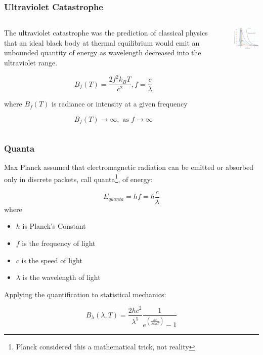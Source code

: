\documentclass{beamer}
\begin{document}
\begin{frame}\frametitle{Ultraviolet Catastrophe}
\begin{columns}
\begin{column}{7.2cm}

The ultraviolet catastrophe was the prediction of classical physics that an ideal black body at thermal equilibrium would emit an unbounded quantity of energy as wavelength decreased into the ultraviolet range.

\[ B_{f}(T) = \frac{2 f^2 k_B T}{c^2}, f = \frac{c}{\lambda}\]

where $B_f(T)$ is radiance or intensity at a given frequency

\[B_{f}(T) \rightarrow \infty, \text{ as } f \rightarrow \infty\]

\end{column}
\begin{column}{4cm}
\begin{center}
\includegraphics[width=4cm]{fig/blackbody.jpg}
\end{center}
\end{column}
\end{columns}
\end{frame}

\begin{frame}\frametitle{Quanta}

Max Planck assumed that electromagnetic radiation can be emitted or absorbed only in discrete packets, call quanta\footnote{Planck considered this a mathematical trick, not reality}, of energy:

\[ E_{quanta} = h f = h \frac{c}{\lambda}\]
where
\begin{itemize}
\item $h$ is Planck's Constant
\item $f$ is the frequency of light
\item $c$ is the speed of light
\item $\lambda$ is the wavelength of light
\end{itemize}

Applying the quantification to statistical mechanics:

\[ B_{\lambda}(\lambda,T) = \frac{2hc^2}{\lambda^5}\frac{1}{e^{(\frac{hc}{\lambda k_B T})}-1}   \]

\end{frame}
\end{document}

